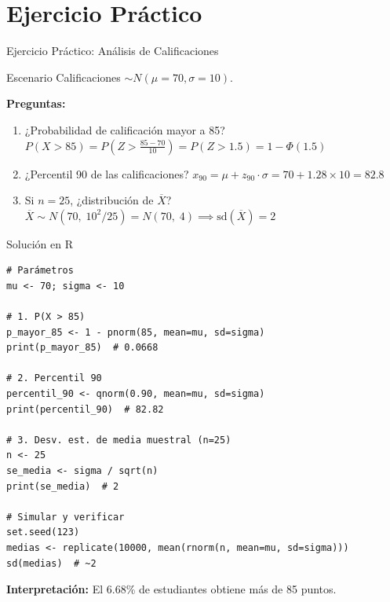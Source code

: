 \documentclass[aspectratio=169,11pt]{beamer}
\begin{document}
\section{Ejercicio Práctico}

\begin{frame}{Ejercicio Práctico: Análisis de Calificaciones}
\small
\begin{block}{Escenario}
Calificaciones $\sim N(\mu = 70, \sigma = 10)$.
\end{block}

\pause
\textbf{Preguntas:}
\begin{enumerate}\setlength{\itemsep}{2pt}
  \item ¿Probabilidad de calificación mayor a 85?
  \pause
  \quad $P(X > 85) = P\!\left(Z > \frac{85-70}{10}\right) = P(Z > 1.5) = 1 - \Phi(1.5)$

  \pause
  \item ¿Percentil 90 de las calificaciones?
  \pause
  \quad $x_{90} = \mu + z_{90} \cdot \sigma = 70 + 1.28 \times 10 = 82.8$

  \pause
  \item Si $n=25$, ¿distribución de $\overline{X}$?
  \pause
  \quad $\overline{X} \sim N(70,\; 10^2/25) = N(70,\; 4) \implies \text{sd}(\overline{X}) = 2$
\end{enumerate}
\end{frame}

\begin{frame}[fragile]{Solución en R}
\begin{lstlisting}[basicstyle=\ttfamily\tiny]
# Parámetros
mu <- 70; sigma <- 10

# 1. P(X > 85)
p_mayor_85 <- 1 - pnorm(85, mean=mu, sd=sigma)
print(p_mayor_85)  # 0.0668

# 2. Percentil 90
percentil_90 <- qnorm(0.90, mean=mu, sd=sigma)
print(percentil_90)  # 82.82

# 3. Desv. est. de media muestral (n=25)
n <- 25
se_media <- sigma / sqrt(n)
print(se_media)  # 2

# Simular y verificar
set.seed(123)
medias <- replicate(10000, mean(rnorm(n, mean=mu, sd=sigma)))
sd(medias)  # ~2
\end{lstlisting}

\pause
\small
\textbf{Interpretación:} El 6.68\% de estudiantes obtiene más de 85 puntos.
\end{frame}
\end{document}
